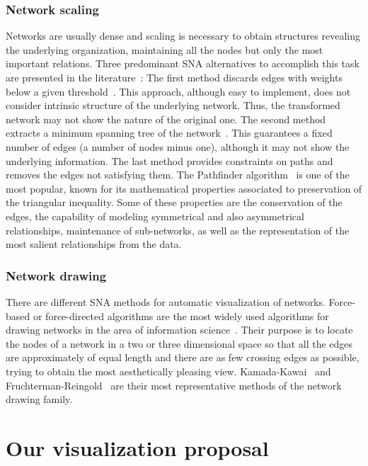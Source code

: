\documentclass[journal]{IEEEtran}
\begin{document}
\subsubsection{Network scaling}
Networks are usually dense and scaling is necessary to obtain structures revealing the underlying organization, maintaining all the nodes but only the most important relations. Three predominant SNA alternatives to accomplish this task are presented in the literature~\cite{chen2003visualizing}: The first method discards edges with weights below a given threshold~\cite{zizi1994accessing}. This approach, although easy to implement, does not consider intrinsic structure of the underlying network. Thus, the transformed network may not show the nature of the original one. The second method extracts a minimum spanning tree of the network~\cite{noel2002visualization}. This guarantees a fixed number of edges (a number of nodes minus one), although 
it may not show the underlying information. The last method provides constraints on paths and removes the edges not satisfying them. The Pathfinder algorithm~\cite{Dearholt90,Sch89} is one of the most popular, known for its mathematical properties associated to preservation of the triangular inequality. Some of these properties are the conservation of the edges, the capability of modeling symmetrical and also asymmetrical relationships, maintenance of sub-networks, as well as the representation of the most salient relationships from the data.

\subsubsection{Network drawing}
There are different SNA methods for automatic visualization of networks. Force-based or force-directed algorithms are the most widely used algorithms for drawing networks in the area of information science~\cite{battista1999graph,kobourov2005force}. Their purpose is to locate the nodes of a network in a two or three dimensional space so that all the edges are approximately of equal length and there are as few crossing edges as possible, trying to obtain the most aesthetically pleasing view. Kamada-Kawai~\cite{KamadaKawai1989} and Fruchterman-Reingold~\cite{fruchterman1991graph} are their most representative methods of the network drawing family.






\section{Our visualization proposal}
\label{sec:mograms}
\end{document}
